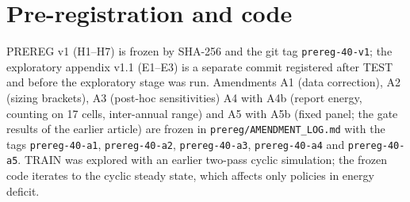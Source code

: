 \documentclass[10pt]{article}
\begin{document}


\section{Pre-registration and code}
PREREG v1 (H1--H7) is frozen by SHA-256 and the git tag \texttt{prereg-40-v1}; the exploratory appendix v1.1 (E1--E3) is a separate commit registered after TEST and before the exploratory stage was run. Amendments A1 (data correction), A2 (sizing brackets), A3 (post-hoc sensitivities) A4 with A4b (report energy, counting on 17 cells, inter-annual range) and A5 with A5b (fixed panel; the gate results of the earlier article) are frozen in \texttt{prereg/AMENDMENT\_LOG.md} with the tags \texttt{prereg-40-a1}, \texttt{prereg-40-a2}, \texttt{prereg-40-a3}, \texttt{prereg-40-a4} and \texttt{prereg-40-a5}. TRAIN was explored with an earlier two-pass cyclic simulation; the frozen code iterates to the cyclic steady state, which affects only policies in energy deficit.
\end{document}
